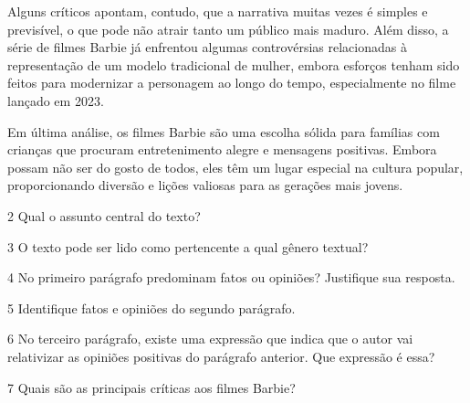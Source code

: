 \begin{myquote}
Alguns críticos apontam, contudo, que a narrativa muitas vezes é simples e
previsível, o que pode não atrair tanto um público mais maduro. Além disso, a
série de filmes Barbie já enfrentou algumas controvérsias relacionadas à
representação de um modelo tradicional de mulher, embora esforços tenham sido feitos
para modernizar a personagem ao longo do tempo, especialmente no filme 
lançado em 2023.

Em última análise, os filmes Barbie são uma escolha sólida para famílias com
crianças que procuram entretenimento alegre e mensagens positivas. Embora
possam não ser do gosto de todos, eles têm um lugar especial na cultura
popular, proporcionando diversão e lições valiosas para as gerações mais
jovens.


\end{myquote}

\num{2} Qual o assunto central do texto?


\num{3} O texto pode ser lido como pertencente a qual gênero textual?


\num{4} No primeiro parágrafo predominam fatos ou opiniões? Justifique sua resposta.


\num{5} Identifique fatos e opiniões do segundo parágrafo.


\num{6} No terceiro parágrafo, existe uma expressão que indica que o autor vai
relativizar as opiniões positivas do parágrafo anterior. Que expressão é essa? 


\num{7} Quais são as principais críticas aos filmes Barbie? 

